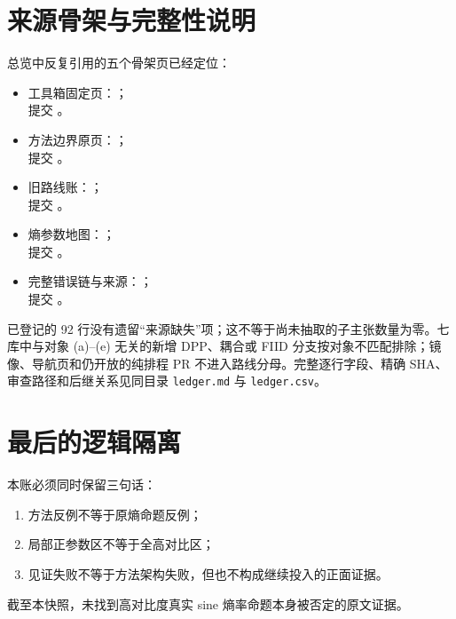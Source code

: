 \documentclass[UTF8,11pt]{ctexart}
\newcommand{\code}[1]{\texttt{#1}}
\begin{document}
\section{来源骨架与完整性说明}

总览中反复引用的五个骨架页已经定位：
\begin{itemize}
  \item 工具箱固定页：；\\提交 \texttt{}。
  \item 方法边界原页：；\\提交 \texttt{}。
  \item 旧路线账：；\\提交 \texttt{}。
  \item 熵参数地图：；\\提交 \texttt{}。
  \item 完整错误链与来源：；\\提交 \texttt{}。
\end{itemize}

已登记的 92 行没有遗留“来源缺失”项；这不等于尚未抽取的子主张数量为零。七库中与对象 (a)--(e) 无关的新增 DPP、耦合或 FIID 分支按对象不匹配排除；镜像、导航页和仍开放的纯排程 PR 不进入路线分母。完整逐行字段、精确 SHA、审查路径和后继关系见同目录 \code{ledger.md} 与 \code{ledger.csv}。

\section{最后的逻辑隔离}

\enlargethispage{4\baselineskip}
本账必须同时保留三句话：
\begin{enumerate}
  \item 方法反例不等于原熵命题反例；
  \item 局部正参数区不等于全高对比区；
  \item 见证失败不等于方法架构失败，但也不构成继续投入的正面证据。
\end{enumerate}

截至本快照，未找到高对比度真实 sine 熵率命题本身被否定的原文证据。
\end{document}
